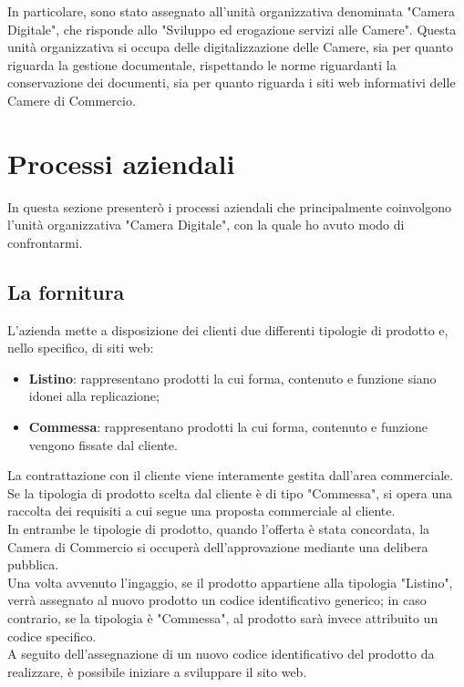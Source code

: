 	In particolare, sono stato assegnato all'unità organizzativa denominata "Camera Digitale", che risponde allo "Sviluppo ed erogazione servizi alle Camere". Questa unità organizzativa si occupa delle digitalizzazione delle Camere, sia per quanto riguarda la gestione documentale, rispettando le norme riguardanti la conservazione dei documenti, sia per quanto riguarda i siti web informativi delle Camere di Commercio.

\section{Processi aziendali}
\label{sec:processi_aziendali}
In questa sezione presenterò i processi aziendali che principalmente coinvolgono l'unità organizzativa "Camera Digitale", con la quale ho avuto modo di confrontarmi.

	\subsection{La fornitura}
	L'azienda mette a disposizione dei clienti due differenti tipologie di prodotto e, nello specifico, di siti web:
	\begin{itemize}
		\item{\textbf{Listino}: rappresentano prodotti la cui forma, contenuto e funzione siano idonei alla replicazione;}
		\item{\textbf{Commessa}: rappresentano prodotti la cui forma, contenuto e funzione vengono fissate dal cliente.}
	\end{itemize}
	La contrattazione con il cliente viene interamente gestita dall'area commerciale. \\
	Se la tipologia di prodotto scelta dal cliente è di tipo "Commessa", si opera una raccolta dei requisiti a cui segue una proposta commerciale al cliente. \\
	In entrambe le tipologie di prodotto, quando l'offerta è stata concordata, la Camera di Commercio si occuperà dell'approvazione mediante una delibera pubblica. \\
	Una volta avvenuto l'ingaggio, se il prodotto appartiene alla tipologia "Listino", verrà assegnato al nuovo prodotto un codice identificativo generico; in caso contrario, se la tipologia è "Commessa", al prodotto sarà invece attribuito un codice specifico. \\
	A seguito dell'assegnazione di un nuovo codice identificativo del prodotto da realizzare, è possibile iniziare a sviluppare il sito web.
	
